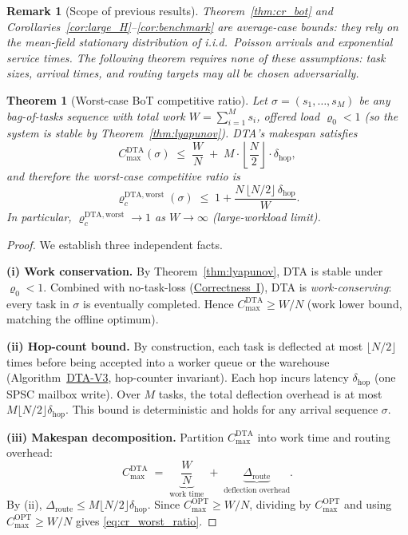 \documentclass[11pt,a4paper]{report}
\newtheorem{theorem}{Theorem}[section]
\newtheorem{remark}{Remark}[section]
\begin{document}
\begin{remark}[Scope of previous results]
Theorem~\ref{thm:cr_bot} and Corollaries~\ref{cor:large_H}--\ref{cor:benchmark}
are \emph{average-case} bounds: they rely on the mean-field stationary
distribution of i.i.d.\ Poisson arrivals and exponential service times.
The following theorem requires \emph{none} of these assumptions: task sizes,
arrival times, and routing targets may all be chosen adversarially.
\end{remark}

\begin{theorem}[Worst-case BoT competitive ratio]\label{thm:cr_bot_worst}
Let $\sigma = (s_1, \ldots, s_M)$ be any bag-of-tasks sequence with total
work $W = \sum_{i=1}^M s_i$, offered load $\varrho_0 < 1$
(so the system is stable by Theorem~\ref{thm:lyapunov}).
DTA's makespan satisfies
\begin{equation}\label{eq:cr_worst}
  C_{\max}^{\mathrm{DTA}}(\sigma)
  \;\le\;
  \frac{W}{N}
  \;+\;
  M \cdot \left\lfloor \frac{N}{2} \right\rfloor \cdot \delta_{\mathrm{hop}},
\end{equation}
and therefore the worst-case competitive ratio is
\begin{equation}\label{eq:cr_worst_ratio}
  \varrho_c^{\mathrm{DTA,worst}}(\sigma)
  \;\le\;
  1 + \frac{N\,\lfloor N/2 \rfloor\,\delta_{\mathrm{hop}}}{W}.
\end{equation}
In particular, $\varrho_c^{\mathrm{DTA,worst}} \to 1$ as $W \to \infty$ (large-workload limit).
\end{theorem}

\begin{proof}
We establish three independent facts.

\textbf{(i) Work conservation.}
By Theorem~\ref{thm:lyapunov}, DTA is stable under $\varrho_0 < 1$.
Combined with no-task-loss (\hyperref[chap:no_task_loss]{Correctness~I}),
DTA is \emph{work-conserving}: every task in $\sigma$ is eventually completed.
Hence $C_{\max}^{\mathrm{DTA}} \ge W/N$ (work lower bound, matching the offline optimum).

\textbf{(ii) Hop-count bound.}
By construction, each task is deflected at most $\lfloor N/2 \rfloor$ times
before being accepted into a worker queue or the warehouse
(Algorithm~\hyperref[chap:formal_model]{DTA-V3}, hop-counter invariant).
Each hop incurs latency $\delta_{\mathrm{hop}}$ (one SPSC mailbox write).
Over $M$ tasks, the total deflection overhead is at most
$M \lfloor N/2 \rfloor \delta_{\mathrm{hop}}$.
This bound is deterministic and holds for any arrival sequence $\sigma$.

\textbf{(iii) Makespan decomposition.}
Partition $C_{\max}^{\mathrm{DTA}}$ into work time and routing overhead:
\[
  C_{\max}^{\mathrm{DTA}}
  \;=\;
  \underbrace{\frac{W}{N}}_{\text{work time}}
  \;+\;
  \underbrace{\Delta_{\mathrm{route}}}_{\text{deflection overhead}}.
\]
By (ii), $\Delta_{\mathrm{route}} \le M \lfloor N/2 \rfloor \delta_{\mathrm{hop}}$.
Since $C_{\max}^{\mathrm{OPT}} \ge W/N$, dividing by $C_{\max}^{\mathrm{OPT}}$
and using $C_{\max}^{\mathrm{OPT}} \ge W/N$ gives \eqref{eq:cr_worst_ratio}.
\end{proof}
\end{document}
